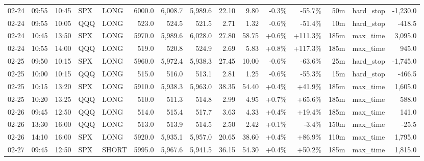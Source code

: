 \documentclass[11pt,a4paper,twoside]{article}
\begin{document}
\begin{landscape}
\begin{center}
\begin{longtable}{>{\color{txtmain}}l l l l l r r r r r r r r >{\color{txtmain}}l r}
02-24 & 09:55 & 10:45 & SPX & LONG & 6000.0 & 6,008.7 & 5,989.6 & 22.10 & 9.80 & \textcolor{lossred}{-0.3\%} & \textcolor{lossred}{-55.7\%} & 50m & hard\_stop & \textcolor{lossred}{-1,230.0} \\
02-24 & 09:55 & 10:05 & QQQ & LONG & 523.0 & 524.5 & 521.5 & 2.71 & 1.32 & \textcolor{lossred}{-0.6\%} & \textcolor{lossred}{-51.4\%} & 10m & hard\_stop & \textcolor{lossred}{-418.5} \\
02-24 & 10:45 & 13:50 & SPX & LONG & 5970.0 & 5,989.6 & 6,028.0 & 27.80 & 58.75 & \textcolor{wingreen}{+0.6\%} & \textcolor{wingreen}{+111.3\%} & 185m & max\_time & \textcolor{wingreen}{3,095.0} \\
02-24 & 10:55 & 14:00 & QQQ & LONG & 519.0 & 520.8 & 524.9 & 2.69 & 5.83 & \textcolor{wingreen}{+0.8\%} & \textcolor{wingreen}{+117.3\%} & 185m & max\_time & \textcolor{wingreen}{945.0} \\
02-25 & 09:50 & 10:15 & SPX & LONG & 5960.0 & 5,972.4 & 5,938.3 & 27.45 & 10.00 & \textcolor{lossred}{-0.6\%} & \textcolor{lossred}{-63.6\%} & 25m & hard\_stop & \textcolor{lossred}{-1,745.0} \\
02-25 & 10:00 & 10:15 & QQQ & LONG & 515.0 & 516.0 & 513.1 & 2.81 & 1.25 & \textcolor{lossred}{-0.6\%} & \textcolor{lossred}{-55.3\%} & 15m & hard\_stop & \textcolor{lossred}{-466.5} \\
02-25 & 10:15 & 13:20 & SPX & LONG & 5910.0 & 5,938.3 & 5,963.0 & 38.35 & 54.40 & \textcolor{wingreen}{+0.4\%} & \textcolor{wingreen}{+41.9\%} & 185m & max\_time & \textcolor{wingreen}{1,605.0} \\
02-25 & 10:20 & 13:25 & QQQ & LONG & 510.0 & 511.3 & 514.8 & 2.99 & 4.95 & \textcolor{wingreen}{+0.7\%} & \textcolor{wingreen}{+65.6\%} & 185m & max\_time & \textcolor{wingreen}{588.0} \\
02-26 & 09:45 & 12:50 & QQQ & LONG & 514.0 & 515.4 & 517.7 & 3.63 & 4.33 & \textcolor{wingreen}{+0.4\%} & \textcolor{wingreen}{+19.4\%} & 185m & max\_time & \textcolor{wingreen}{141.0} \\
02-26 & 13:30 & 16:00 & QQQ & LONG & 513.0 & 513.9 & 514.5 & 2.50 & 2.42 & \textcolor{wingreen}{+0.1\%} & \textcolor{lossred}{-3.4\%} & 150m & max\_time & \textcolor{lossred}{-25.5} \\
02-26 & 14:10 & 16:00 & SPX & LONG & 5920.0 & 5,935.1 & 5,957.0 & 20.65 & 38.60 & \textcolor{wingreen}{+0.4\%} & \textcolor{wingreen}{+86.9\%} & 110m & max\_time & \textcolor{wingreen}{1,795.0} \\
02-27 & 09:45 & 12:50 & SPX & SHORT & 5995.0 & 5,967.6 & 5,941.5 & 36.15 & 54.30 & \textcolor{wingreen}{+0.4\%} & \textcolor{wingreen}{+50.2\%} & 185m & max\_time & \textcolor{wingreen}{1,815.0} \\

\end{longtable}
\end{center}
\end{landscape}
\end{document}
